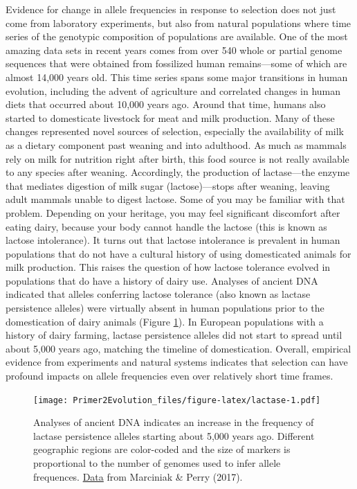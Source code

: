 \documentclass[
]{book}
\begin{document}
Evidence for change in allele frequencies in response to selection does not just come from laboratory experiments, but also from natural populations where time series of the genotypic composition of populations are available. One of the most amazing data sets in recent years comes from over 540 whole or partial genome sequences that were obtained from fossilized human remains---some of which are almost 14,000 years old. This time series spans some major transitions in human evolution, including the advent of agriculture and correlated changes in human diets that occurred about 10,000 years ago. Around that time, humans also started to domesticate livestock for meat and milk production. Many of these changes represented novel sources of selection, especially the availability of milk as a dietary component past weaning and into adulthood. As much as mammals rely on milk for nutrition right after birth, this food source is not really available to any species after weaning. Accordingly, the production of lactase---the enzyme that mediates digestion of milk sugar (lactose)---stops after weaning, leaving adult mammals unable to digest lactose. Some of you may be familiar with that problem. Depending on your heritage, you may feel significant discomfort after eating dairy, because your body cannot handle the lactose (this is known as lactose intolerance). It turns out that lactose intolerance is prevalent in human populations that do not have a cultural history of using domesticated animals for milk production. This raises the question of how lactose tolerance evolved in populations that do have a history of dairy use. Analyses of ancient DNA indicated that alleles conferring lactose tolerance (also known as lactase persistence alleles) were virtually absent in human populations prior to the domestication of dairy animals (Figure \ref{fig:lactase}). In European populations with a history of dairy farming, lactase persistence alleles did not start to spread until about 5,000 years ago, matching the timeline of domestication. Overall, empirical evidence from experiments and natural systems indicates that selection can have profound impacts on allele frequencies even over relatively short time frames.

\begin{figure}
\centering
\texttt{[image: Primer2Evolution\_files/figure-latex/lactase-1.pdf]}
\caption{\label{fig:lactase}Analyses of ancient DNA indicates an increase in the frequency of lactase persistence alleles starting about 5,000 years ago. Different geographic regions are color-coded and the size of markers is proportional to the number of genomes used to infer allele frequences. \href{data/5_lactase.csv}{Data} from Marciniak \& Perry (2017).}
\end{figure}
\end{document}
